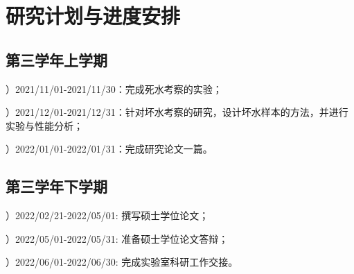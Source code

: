 \chapter{研究计划与进度安排}

\section{第三学年上学期}

）2021/11/01-2021/11/30：完成死水考察的实验；

）2021/12/01-2021/12/31：针对坏水考察的研究，设计坏水样本的方法，并进行实验与性能分析；

）2022/01/01-2022/01/31：完成研究论文一篇。

\section{第三学年下学期}

）2022/02/21-2022/05/01: 撰写硕士学位论文；

）2022/05/01-2022/05/31: 准备硕士学位论文答辩；

）2022/06/01-2022/06/30: 完成实验室科研工作交接。